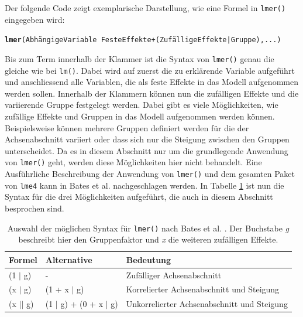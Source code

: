 \documentclass[12pt]{article}\usepackage[]{graphicx}\usepackage[]{color}
\makeatletter
\newcommand{\hlkwd}[1]{\textcolor[rgb]{0.737,0.353,0.396}{\textbf{#1}}}%
\newenvironment{kframe}{%
 \def\at@end@of@kframe{}%
 \ifinner\ifhmode%
  \def\at@end@of@kframe{\end{minipage}}%
  \begin{minipage}{\columnwidth}%
 \fi\fi%
 \def\FrameCommand##1{\hskip\@totalleftmargin \hskip-\fboxsep
 \colorbox{shadecolor}{##1}\hskip-\fboxsep
     \hskip-\linewidth \hskip-\@totalleftmargin \hskip\columnwidth}%
 \MakeFramed {\advance\hsize-\width
   \@totalleftmargin\z@ \linewidth\hsize
   \@setminipage}}%
 {\par\unskip\endMakeFramed%
 \at@end@of@kframe}
\newenvironment{knitrout}{}{} %
\makeatother
\begin{document}
Der folgende Code zeigt exemplarische Darstellung, wie eine Formel in \texttt{lmer()} eingegeben wird:

\singlespacing
\begin{knitrout}
\color{fgcolor}\begin{kframe}
\begin{alltt}
\hlkwd{lmer}(Abhängige Variable ~ Feste Effekte + (Zufällige Effekte | Gruppe), ... )
\end{alltt}
\end{kframe}
\end{knitrout}

Bis zum Term innerhalb der Klammer ist die Syntax von \texttt{lmer()} genau die gleiche wie bei \texttt{lm()}. Dabei wird auf zuerst die zu erklärende Variable aufgeführt und anschliessend alle Variablen, die als feste Effekte in das Modell aufgenommen werden sollen. Innerhalb der Klammern können nun die zufälligen Effekte und die variierende Gruppe festgelegt werden. Dabei gibt es viele Möglichkeiten, wie zufällige Effekte und Gruppen in das Modell aufgenommen werden können. Beispielsweise können mehrere Gruppen definiert werden für die der Achsenabschnitt variiert oder dass sich nur die Steigung zwischen den Gruppen unterscheidet. Da es in diesem Abschnitt nur um die grundlegende Anwendung von \texttt{lmer()} geht, werden diese Möglichkeiten hier nicht behandelt. Eine Ausführliche Beschreibung der Anwendung von \texttt{lmer()} und dem gesamten Paket von \texttt{lme4} kann in Bates et al. \citeyearpar{batesetal2015lme4} nachgeschlagen werden. In Tabelle \ref{tab:lmersyntax} ist nun die Syntax für die drei Möglichkeiten aufgeführt, die auch in diesem Abschnitt besprochen sind.
\begin{table}[ht] 
\centering
\begin{threeparttable}
\caption{Auswahl der möglichen Syntax für \texttt{lmer()} nach Bates et al. \citeyearpar{batesetal2015lme4}. Der Buchstabe \textit{g} beschreibt hier den Gruppenfaktor und \textit{x} die weiteren zufälligen Effekte.}
\begin{tabular}{lll}
 	\toprule
	Formel & Alternative & Bedeutung\\ 
  	\midrule
	(1 $|$ g)	& - 		& Zufälliger Achsenabschnitt \\
	(x $|$ g) 	& (1 + x $|$ g)	& Korrelierter Achsenabschnitt und Steigung \\
	(x $||$ g) & (1 $|$ g) + (0 + x $|$ g)	& Unkorrelierter Achsenabschnitt und Steigung\\
  	\bottomrule
\end{tabular}
\label{tab:lmersyntax}
\end{threeparttable}
\end{table}
\end{document}
